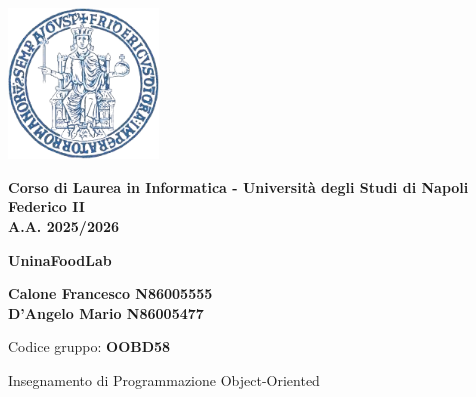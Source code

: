 \documentclass{article}
\begin{document}
\thispagestyle{firstpage}


\begin{center}
    \includegraphics[width=0.3\textwidth]{latex/immagini/uni_logo.png} 
    \vspace{0.5cm}

    {\large \textbf{Corso di Laurea in Informatica - Università degli Studi di Napoli Federico II}}\\
    {\large \textbf{A.A. 2025/2026}}\\[1cm]
    \vspace{1cm}

    {\Huge \color{myblue} \textbf{UninaFoodLab}}\\[2cm]

    \begin{flushleft}
    \centering
    {\large
    \textbf{Calone Francesco N86005555}\\
    \vspace{0.2cm}
    \textbf{D'Angelo Mario N86005477}\\
    }
    
    \vspace{0.2cm}
    {\small Codice gruppo: \textbf{OOBD58}}\\
    \vspace{0.8cm} 

    {\small Insegnamento di Programmazione Object-Oriented}
    \end{flushleft}
\end{center}


\newpage

\pagestyle{normal}

\tableofcontents
\thispagestyle{normal}




\end{document}
